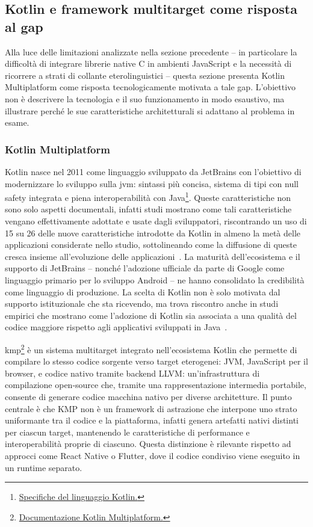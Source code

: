 \subsection{Kotlin e framework multitarget come risposta al gap}
\label{sec:background-multitarget}

Alla luce delle limitazioni analizzate nella sezione precedente -- in particolare la difficoltà di integrare librerie native C in ambienti JavaScript e la necessità di ricorrere a strati di collante eterolinguistici -- questa sezione presenta Kotlin Multiplatform come risposta tecnologicamente motivata a tale gap. L'obiettivo non è descrivere la tecnologia e il suo funzionamento in modo esaustivo, ma illustrare perché le sue caratteristiche architetturali si adattano al problema in esame.

\subsubsection{Kotlin Multiplatform}
\label{subsec:background-kmp}

Kotlin nasce nel 2011 come linguaggio sviluppato da JetBrains con l'obiettivo di modernizzare lo sviluppo sulla \ac{jvm}: sintassi più concisa, sistema di tipi con null safety integrata e piena interoperabilità con Java\footnote{\href{https://kotlinlang.org/spec/introduction.html}{Specifiche del linguaggio Kotlin.}}.
Queste caratteristiche non sono solo aspetti documentali, infatti studi mostrano come tali caratteristiche vengano effettivamente adottate e usate dagli sviluppatori, riscontrando un uso di 15 su 26 delle nuove caratteristiche introdotte da Kotlin in almeno la metà delle applicazioni considerate nello studio, sottolineando come la diffusione di queste cresca insieme all'evoluzione delle applicazioni~\cite{DBLP:conf/esem/MateusM20}.
La maturità dell'ecosistema e il supporto di JetBrains -- nonché l'adozione ufficiale da parte di Google come linguaggio primario per lo sviluppo Android -- ne hanno consolidato la credibilità come linguaggio di produzione.
La scelta di Kotlin non è solo motivata dal supporto istituzionale che sta ricevendo, ma trova riscontro anche in studi empirici che mostrano come l'adozione di Kotlin sia associata a una qualità del codice maggiore rispetto agli applicativi sviluppati in Java~\cite{DBLP:journals/ese/MateusM19}.

\ac{kmp}\footnote{\href{https://kotlinlang.org/docs/multiplatform/get-started.html}{Documentazione Kotlin Multiplatform.}} è un sistema multitarget integrato nell'ecosiste\-ma Kotlin  che permette di compilare lo stesso codice sorgente verso target eterogenei: JVM, JavaScript per il browser, e codice nativo tramite backend LLVM: un'infrastruttura di compilazione open-source che, tramite una rappresentazione intermedia portabile, consente di generare codice macchina nativo per diverse architetture. Il punto centrale è che KMP non è un framework di astrazione che interpone uno strato uniformante tra il codice e la piattaforma, infatti genera artefatti nativi distinti per ciascun target, mantenendo le caratteristiche di performance e interoperabilità proprie di ciascuno. Questa distinzione è rilevante rispetto ad approcci come React Native o Flutter, dove il codice condiviso viene eseguito in un runtime separato.

